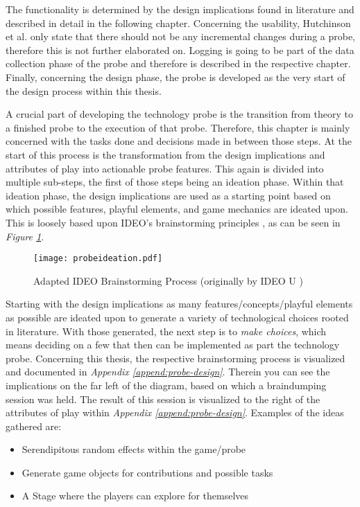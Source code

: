 The functionality is determined by the design implications found in literature and described in detail in the following chapter. Concerning the usability, Hutchinson et al. only state that there should not be any incremental changes during a probe, therefore this is not further elaborated on. Logging is going to be part of the data collection phase of the probe and therefore is described in the respective chapter. Finally, concerning the design phase, the probe is developed as the very start of the design process within this thesis.

A crucial part of developing the technology probe is the transition from theory to a finished probe to the execution of that probe. Therefore, this chapter is mainly concerned with the tasks done and decisions made in between those steps. At the start of this process is the transformation from the design implications and attributes of play  into actionable probe features. This again is divided into multiple sub-steps, the first of those steps being an ideation phase. Within that ideation phase, the design implications are used as a starting point based on which possible features, playful elements, and game mechanics are ideated upon. This is loosely based upon IDEO's brainstorming principles \cite{ideo2021brainstorming}, as can be seen in \textit{Figure \ref{fig:probeideation}}.

\begin{figure}[h]
  \centering
  \texttt{[image: probeideation.pdf]}
  \caption{Adapted IDEO Brainstorming Process (originally by IDEO U \cite{ideo2021brainstorming})}
  \label{fig:probeideation}
\end{figure}

Starting with the design implications as many features/concepts/playful elements as possible are ideated upon to generate a variety of technological choices rooted in literature. With those generated, the next step is to \textit{make choices}, which means deciding on a few that then can be implemented as part the technology probe. Concerning this thesis, the respective brainstorming process is visualized and documented in \textit{Appendix \ref{append:probe-design}}. Therein you can see the implications on the far left of the diagram, based on which a braindumping session \cite{ia2021dumping} was held. The result of this session is visualized to the right of the attributes of play within \textit{Appendix \ref{append:probe-design}}. Examples of the ideas gathered are:

\begin{itemize}
  \item{Serendipitous random effects within the game/probe}
  \item{Generate game objects for contributions and possible tasks}
  \item{A Stage where the players can explore for themselves}
\end{itemize}

